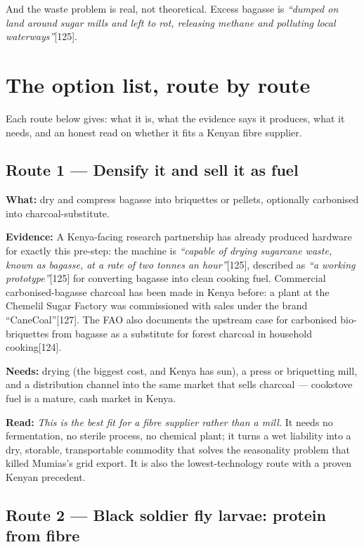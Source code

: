 \documentclass[11pt]{article}
\newcommand{\src}[1]{[#1]}
\begin{document}
And the waste problem is real, not theoretical. Excess bagasse is
\emph{``dumped on land around sugar mills and left to rot, releasing methane and
polluting local waterways''}\src{125}.

\section{The option list, route by route}

Each route below gives: what it is, what the evidence says it produces, what it
needs, and an honest read on whether it fits a Kenyan fibre supplier.

\subsection{Route 1 --- Densify it and sell it as fuel}

\textbf{What:} dry and compress bagasse into briquettes or pellets, optionally
carbonised into charcoal-substitute.

\textbf{Evidence:} A Kenya-facing research partnership has already produced
hardware for exactly this pre-step: the machine is \emph{``capable of drying
sugarcane waste, known as bagasse, at a rate of two tonnes an hour''}\src{125},
described as \emph{``a working prototype''}\src{125} for converting bagasse
into clean cooking fuel. Commercial carbonised-bagasse charcoal has been made
in Kenya before: a plant at the Chemelil Sugar Factory was commissioned with
sales under the brand ``CaneCoal''\src{127}. The FAO also documents the
upstream case for carbonised bio-briquettes from bagasse as a substitute for
forest charcoal in household cooking\src{124}.

\textbf{Needs:} drying (the biggest cost, and Kenya has sun), a press or
briquetting mill, and a distribution channel into the same market that sells
charcoal --- cookstove fuel is a mature, cash market in Kenya.

\textbf{Read:} \emph{This is the best fit for a fibre supplier rather than a
mill.} It needs no fermentation, no sterile process, no chemical plant; it
turns a wet liability into a dry, storable, transportable commodity that
solves the seasonality problem that killed Mumias's grid export. It is also the
lowest-technology route with a proven Kenyan precedent.

\subsection{Route 2 --- Black soldier fly larvae: protein from fibre}
\end{document}
